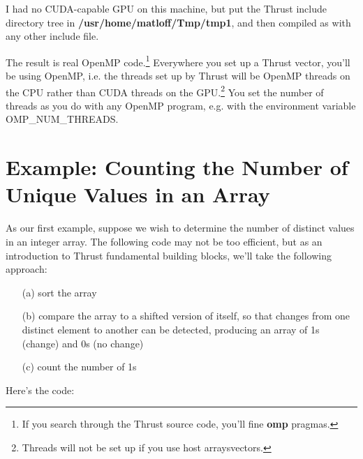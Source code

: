 I had no CUDA-capable GPU on this machine, but put the Thrust include directory
tree in {\bf /usr/home/matloff/Tmp/tmp1}, and then compiled as with any
other include file.

The result is real OpenMP code.\footnote{If you search through the
Thrust source code, you'll fine {\bf omp} pragmas.}  Everywhere you set
up a Thrust vector, you'll be using OpenMP, i.e. the threads set
up by Thrust will be OpenMP threads on the CPU rather than CUDA threads
on the GPU.\footnote{Threads will not be set up if you use host
arraysvectors.}  You set the number of threads as you do with any OpenMP
program, e.g. with the environment variable OMP\_NUM\_THREADS.

\section{Example:  Counting the Number of Unique Values in an
Array}

As our first example, suppose we wish to determine the number of
distinct values in an integer array.  The following code may not be too
efficient, but as an introduction to Thrust fundamental building
blocks, we'll take the following approach:

\begin{itemize}

\item [(a)] sort the array

\item [(b)] compare the array to a shifted version of itself, so that
changes from one distinct element to another can be detected, producing
an array of 1s (change) and 0s (no change)

\item [(c)] count the number of 1s

\end{itemize}

Here's the code:

